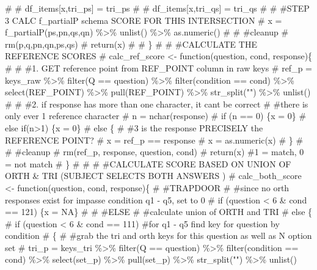 \documentclass[
  letterpaper,
  DIV=11,
  numbers=noendperiod]{scrreprt}
\newenvironment{Shaded}{\begin{snugshade}}{\end{snugshade}}
\newcommand{\CommentTok}[1]{\textcolor[rgb]{0.37,0.37,0.37}{#1}}
\begin{document}
\begin{Shaded}
\begin{Highlighting}[]
\CommentTok{\#   \# df\_items[x,\textquotesingle{}tri\_ps\textquotesingle{}] = tri\_ps}
\CommentTok{\#   \# df\_items[x,\textquotesingle{}tri\_qs\textquotesingle{}] = tri\_qs}
\CommentTok{\# }
\CommentTok{\#   \#STEP 3 CALC f\_partialP schema SCORE FOR THIS INTERSECTION}
\CommentTok{\#   x = f\_partialP(ps,pn,qs,qn) \%\textgreater{}\% unlist() \%\textgreater{}\% as.numeric()}
\CommentTok{\#   }
\CommentTok{\#   \#cleanup}
\CommentTok{\#   rm(p,q,pn,qn,ps,qs)}
\CommentTok{\#   return(x)}
\CommentTok{\# }
\CommentTok{\# \}}
\CommentTok{\# }
\CommentTok{\# \#CALCULATE THE REFERENCE SCORES}
\CommentTok{\# calc\_ref\_score \textless{}{-} function(question, cond, response)\{}
\CommentTok{\#   }
\CommentTok{\#     \#1. GET reference point from REF\_POINT column in raw keys}
\CommentTok{\#     ref\_p = keys\_raw \%\textgreater{}\% filter(Q == question) \%\textgreater{}\% filter(condition == cond) \%\textgreater{}\% select(REF\_POINT) \%\textgreater{}\% pull(REF\_POINT) \%\textgreater{}\% str\_split("") \%\textgreater{}\% unlist()}
\CommentTok{\#      }
\CommentTok{\#     \#2. if response has more than one character, it can\textquotesingle{}t be correct}
\CommentTok{\#     \#there is only ever 1 reference character}
\CommentTok{\#     n = nchar(response)}
\CommentTok{\#     if (n == 0) \{x = 0\}}
\CommentTok{\#     else if(n\textgreater{}1) \{x = 0\}}
\CommentTok{\#     else \{}
\CommentTok{\#       \#3 is the response PRECISELY the REFERENCE POINT?}
\CommentTok{\#       x = ref\_p == response}
\CommentTok{\#       x = as.numeric(x)  }
\CommentTok{\#     \}}
\CommentTok{\#     }
\CommentTok{\#     \#cleanup}
\CommentTok{\#     rm(ref\_p, response, question, cond)   }
\CommentTok{\#     return(x) \#1 = match, 0 = not match}
\CommentTok{\# \}}
\CommentTok{\# }
\CommentTok{\# }
\CommentTok{\# \#CALCULATE SCORE BASED ON UNION OF ORTH \& TRI (SUBJECT SELECTS BOTH ANSWERS )}
\CommentTok{\# calc\_both\_score \textless{}{-} function(question, cond, response)\{}
\CommentTok{\#   }
\CommentTok{\#TRAPDOOR }
\CommentTok{\#   \#since no orth responses exist for impasse condition q1 {-} q5, set to 0}
\CommentTok{\#   if (question \textless{} 6 \& cond == 121) \{x = NA\}}
\CommentTok{\#   }
\CommentTok{\#   \#ELSE }
\CommentTok{\#   \#calculate union of ORTH and TRI}
\CommentTok{\#   else \{}
\CommentTok{\#     if (question \textless{} 6 \& cond == 111) \#for q1 {-} q5 find key for question by condition}
\CommentTok{\#   \{}
\CommentTok{\#      \#grab the tri and orth keys for this question as well as N option set}
\CommentTok{\#      tri\_p =  keys\_tri \%\textgreater{}\%  filter(Q == question) \%\textgreater{}\% filter(condition == cond) \%\textgreater{}\% select(set\_p) \%\textgreater{}\% pull(set\_p) \%\textgreater{}\% str\_split("") \%\textgreater{}\% unlist()}

\end{Highlighting}
\end{Shaded}
\end{document}
